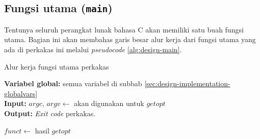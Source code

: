 \subsection{Fungsi utama (\texttt{main})}
\label{sec:design-code-main}

Tentunya seluruh perangkat lunak bahasa C akan memiliki satu buah fungsi utama. Bagian ini akan membahas garis besar alur kerja dari fungsi utama yang ada di perkakas ini melalui \textit{pseudocode} \ref{alg:design-main}.

\begin{algorithm}[h]
	\caption{Alur kerja fungsi utama perkakas}
	\label{alg:design-main}
	\vspace{-0.6\baselineskip}
	\begin{flushleft}
		\textbf{Variabel global:} semua variabel di subbab \ref{sec:design-implementation-globalvars} \\
		\textbf{Input:} $argc$, $argv \gets$ akan digunakan untuk $getopt$ \\
		\textbf{Output:} \textit{Exit code} perkakas. \\
	\end{flushleft}
	\vspace{-1.05\baselineskip}
	\begin{algorithmic}
		 
			\State $funct \gets$ hasil $getopt$
			

\end{algorithmic}
\end{algorithm}
